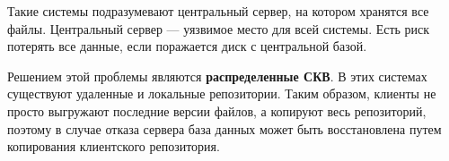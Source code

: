 \documentclass{article}
\begin{document}
\begin{figure}[h]
\end{figure}

Такие системы подразумевают центральный сервер, на котором хранятся все файлы. 
Центральный сервер — уязвимое место для всей системы. Есть риск потерять все данные, если поражается диск с центральной базой.


\begin{figure}[h]
\end{figure}

Решением этой проблемы являются \textbf{распределенные СКВ}. В этих системах существуют удаленные и локальные репозитории.
Таким образом, клиенты не просто выгружают последние версии файлов, а копируют весь репозиторий, поэтому в случае отказа сервера база данных может быть восстановлена путем копирования клиентского репозитория.
\end{document}
